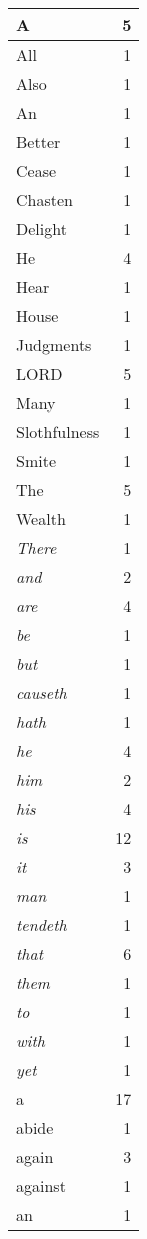 \begin{center}
\begin{longtable}{l|r}
A & 5\\ \hline 
All & 1\\ \hline 
Also & 1\\ \hline 
An & 1\\ \hline 
Better & 1\\ \hline 
Cease & 1\\ \hline 
Chasten & 1\\ \hline 
Delight & 1\\ \hline 
He & 4\\ \hline 
Hear & 1\\ \hline 
House & 1\\ \hline 
Judgments & 1\\ \hline 
LORD & 5\\ \hline 
Many & 1\\ \hline 
Slothfulness & 1\\ \hline 
Smite & 1\\ \hline 
The & 5\\ \hline 
Wealth & 1\\ \hline 
\emph{There} & 1\\ \hline 
\emph{and} & 2\\ \hline 
\emph{are} & 4\\ \hline 
\emph{be} & 1\\ \hline 
\emph{but} & 1\\ \hline 
\emph{causeth} & 1\\ \hline 
\emph{hath} & 1\\ \hline 
\emph{he} & 4\\ \hline 
\emph{him} & 2\\ \hline 
\emph{his} & 4\\ \hline 
\emph{is} & 12\\ \hline 
\emph{it} & 3\\ \hline 
\emph{man} & 1\\ \hline 
\emph{tendeth} & 1\\ \hline 
\emph{that} & 6\\ \hline 
\emph{them} & 1\\ \hline 
\emph{to} & 1\\ \hline 
\emph{with} & 1\\ \hline 
\emph{yet} & 1\\ \hline 
a & 17\\ \hline 
abide & 1\\ \hline 
again & 3\\ \hline 
against & 1\\ \hline 
an & 1\\ \hline 

\end{longtable}
\end{center}
